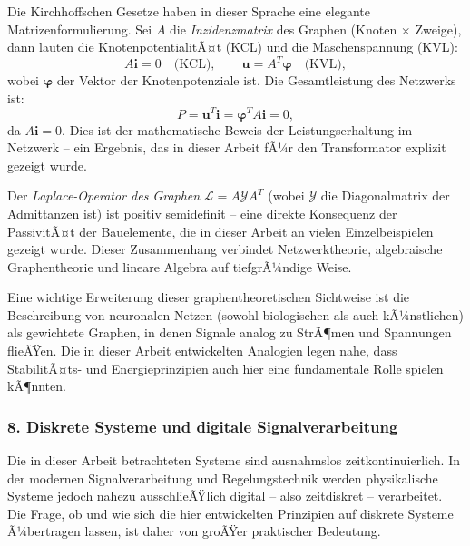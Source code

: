 ﻿\documentclass[12pt, a4paper]{article}
\begin{document}
	Die Kirchhoffschen Gesetze haben in dieser Sprache eine elegante Matrizenformulierung. Sei $A$ die \textit{Inzidenzmatrix} des Graphen (Knoten $\times$ Zweige), dann lauten die KnotenpotentialitÃ¤t (KCL) und die Maschenspannung (KVL):
	\begin{equation}
		A \mathbf{i} = 0 \quad \text{(KCL)}, \qquad \mathbf{u} = A^T \boldsymbol{\varphi} \quad \text{(KVL)},
	\end{equation}
	wobei $\boldsymbol{\varphi}$ der Vektor der Knotenpotenziale ist. Die Gesamtleistung des Netzwerks ist:
	\begin{equation}
		P = \mathbf{u}^T \mathbf{i} = \boldsymbol{\varphi}^T A \mathbf{i} = 0,
	\end{equation}
	da $A \mathbf{i} = 0$. Dies ist der mathematische Beweis der Leistungserhaltung im Netzwerk -- ein Ergebnis, das in dieser Arbeit fÃ¼r den Transformator explizit gezeigt wurde.

	Der \textit{Laplace-Operator des Graphen} $\mathcal{L} = A \mathcal{Y} A^T$ (wobei $\mathcal{Y}$ die Diagonalmatrix der Admittanzen ist) ist positiv semidefinit -- eine direkte Konsequenz der PassivitÃ¤t der Bauelemente, die in dieser Arbeit an vielen Einzelbeispielen gezeigt wurde. Dieser Zusammenhang verbindet Netzwerktheorie, algebraische Graphentheorie und lineare Algebra auf tiefgrÃ¼ndige Weise.

	Eine wichtige Erweiterung dieser graphentheoretischen Sichtweise ist die Beschreibung von neuronalen Netzen (sowohl biologischen als auch kÃ¼nstlichen) als gewichtete Graphen, in denen Signale analog zu StrÃ¶men und Spannungen flieÃŸen. Die in dieser Arbeit entwickelten Analogien legen nahe, dass StabilitÃ¤ts- und Energieprinzipien auch hier eine fundamentale Rolle spielen kÃ¶nnten.

	\subsubsection*{8. \quad Diskrete Systeme und digitale Signalverarbeitung}

	Die in dieser Arbeit betrachteten Systeme sind ausnahmslos zeitkontinuierlich. In der modernen Signalverarbeitung und Regelungstechnik werden physikalische Systeme jedoch nahezu ausschlieÃŸlich digital -- also zeitdiskret -- verarbeitet. Die Frage, ob und wie sich die hier entwickelten Prinzipien auf diskrete Systeme Ã¼bertragen lassen, ist daher von groÃŸer praktischer Bedeutung.
\end{document}
